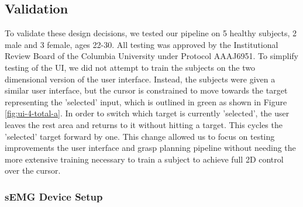 \subsection{Validation}
To validate these design decisions, we tested our pipeline on 5 healthy subjects, 2 male and 3 female, ages 22-30. All testing was approved by the Institutional Review Board of the Columbia University under Protocol AAAJ6951. To simplify testing of the UI, we did not attempt to train the subjects on the two dimensional version of the user interface. Instead, the subjects were given a similar user interface, but the cursor is constrained to move towards the target representing the 'selected' input, which is outlined in green as shown in Figure \ref{fig:ui-4-total-a}. In order to switch which target is currently 'selected', the user leaves the rest area and returns to it without hitting a target. This cycles the 'selected' target forward by one. This change allowed us to focus on testing improvements the user interface and grasp planning pipeline without needing the more extensive training necessary to train a subject to achieve full 2D control over the cursor. 

\subsubsection{sEMG Device Setup}

